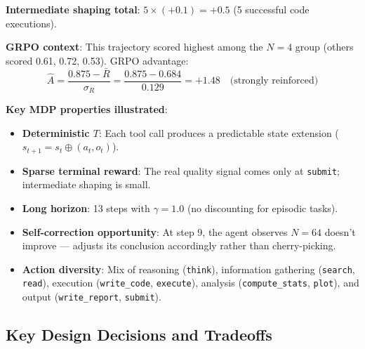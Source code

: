 \begin{examplebox}
\textbf{Intermediate shaping total}: $5 \times (+0.1) = +0.5$ (5 successful code executions).

\textbf{GRPO context}: This trajectory scored highest among the $N=4$ group (others scored 0.61, 0.72, 0.53). GRPO advantage: 
\[
\hat{A} = \frac{0.875 - \bar{R}}{\sigma_R} = \frac{0.875 - 0.684}{0.129} = +1.48 \quad \text{(strongly reinforced)}
\]

\textbf{Key MDP properties illustrated}:

\begin{itemize}
  \item \textbf{Deterministic $T$}: Each tool call produces a predictable state extension ($s_{t+1} = s_t \oplus (a_t, o_t)$).
  \item \textbf{Sparse terminal reward}: The real quality signal comes only at \texttt{submit}; intermediate shaping is small.
  \item \textbf{Long horizon}: 13 steps with $\gamma = 1.0$ (no discounting for episodic tasks).
  \item \textbf{Self-correction opportunity}: At step 9, the agent observes $N=64$ doesn’t improve --- adjusts its conclusion accordingly rather than cherry-picking.
  \item \textbf{Action diversity}: Mix of reasoning (\texttt{think}), information gathering (\texttt{search}, \texttt{read}), execution (\texttt{write\_code}, \texttt{execute}), analysis (\texttt{compute\_stats}, \texttt{plot}), and output (\texttt{write\_report}, \texttt{submit}).
\end{itemize}
\end{examplebox}

\subsection{Key Design Decisions and Tradeoffs}
\label{key-design-decisions-and-tradeoffs}

